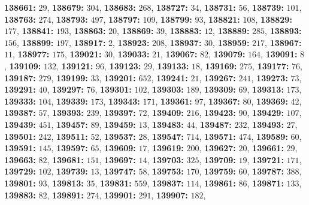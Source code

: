 \textsf{\bfseries 138661:} $29$, \textsf{\bfseries 138679:} $304$, \textsf{\bfseries 138683:} $268$, \textsf{\bfseries 138727:} $34$, \textsf{\bfseries 138731:} $56$, \textsf{\bfseries 138739:} $101$, \textsf{\bfseries 138763:} $274$, \textsf{\bfseries 138793:} $497$, \textsf{\bfseries 138797:} $109$, \textsf{\bfseries 138799:} $93$, \textsf{\bfseries 138821:} $108$, \textsf{\bfseries 138829:} $177$, \textsf{\bfseries 138841:} $193$, \textsf{\bfseries 138863:} $20$, \textsf{\bfseries 138869:} $39$, \textsf{\bfseries 138883:} $12$, \textsf{\bfseries 138889:} $285$, \textsf{\bfseries 138893:} $156$, \textsf{\bfseries 138899:} $197$, \textsf{\bfseries 138917:} $2$, \textsf{\bfseries 138923:} $208$, \textsf{\bfseries 138937:} $30$, \textsf{\bfseries 138959:} $217$, \textsf{\bfseries 138967:} $11$, \textsf{\bfseries 138977:} $175$, \textsf{\bfseries 139021:} $30$, \textsf{\bfseries 139033:} $21$, \textsf{\bfseries 139067:} $82$, \textsf{\bfseries 139079:} $164$, \textsf{\bfseries 139091:} $8$, \textsf{\bfseries 139109:} $132$, \textsf{\bfseries 139121:} $96$, \textsf{\bfseries 139123:} $29$, \textsf{\bfseries 139133:} $18$, \textsf{\bfseries 139169:} $275$, \textsf{\bfseries 139177:} $76$, \textsf{\bfseries 139187:} $279$, \textsf{\bfseries 139199:} $33$, \textsf{\bfseries 139201:} $652$, \textsf{\bfseries 139241:} $21$, \textsf{\bfseries 139267:} $241$, \textsf{\bfseries 139273:} $73$, \textsf{\bfseries 139291:} $40$, \textsf{\bfseries 139297:} $76$, \textsf{\bfseries 139301:} $102$, \textsf{\bfseries 139303:} $189$, \textsf{\bfseries 139309:} $69$, \textsf{\bfseries 139313:} $173$, \textsf{\bfseries 139333:} $104$, \textsf{\bfseries 139339:} $173$, \textsf{\bfseries 139343:} $171$, \textsf{\bfseries 139361:} $97$, \textsf{\bfseries 139367:} $80$, \textsf{\bfseries 139369:} $42$, \textsf{\bfseries 139387:} $57$, \textsf{\bfseries 139393:} $239$, \textsf{\bfseries 139397:} $72$, \textsf{\bfseries 139409:} $216$, \textsf{\bfseries 139423:} $90$, \textsf{\bfseries 139429:} $107$, \textsf{\bfseries 139439:} $451$, \textsf{\bfseries 139457:} $89$, \textsf{\bfseries 139459:} $13$, \textsf{\bfseries 139483:} $44$, \textsf{\bfseries 139487:} $232$, \textsf{\bfseries 139493:} $27$, \textsf{\bfseries 139501:} $242$, \textsf{\bfseries 139511:} $52$, \textsf{\bfseries 139537:} $28$, \textsf{\bfseries 139547:} $714$, \textsf{\bfseries 139571:} $474$, \textsf{\bfseries 139589:} $60$, \textsf{\bfseries 139591:} $145$, \textsf{\bfseries 139597:} $65$, \textsf{\bfseries 139609:} $17$, \textsf{\bfseries 139619:} $200$, \textsf{\bfseries 139627:} $20$, \textsf{\bfseries 139661:} $29$, \textsf{\bfseries 139663:} $82$, \textsf{\bfseries 139681:} $151$, \textsf{\bfseries 139697:} $14$, \textsf{\bfseries 139703:} $325$, \textsf{\bfseries 139709:} $19$, \textsf{\bfseries 139721:} $171$, \textsf{\bfseries 139729:} $102$, \textsf{\bfseries 139739:} $13$, \textsf{\bfseries 139747:} $58$, \textsf{\bfseries 139753:} $170$, \textsf{\bfseries 139759:} $60$, \textsf{\bfseries 139787:} $388$, \textsf{\bfseries 139801:} $93$, \textsf{\bfseries 139813:} $35$, \textsf{\bfseries 139831:} $559$, \textsf{\bfseries 139837:} $114$, \textsf{\bfseries 139861:} $86$, \textsf{\bfseries 139871:} $133$, \textsf{\bfseries 139883:} $82$, \textsf{\bfseries 139891:} $274$, \textsf{\bfseries 139901:} $291$, \textsf{\bfseries 139907:} $182$, 
